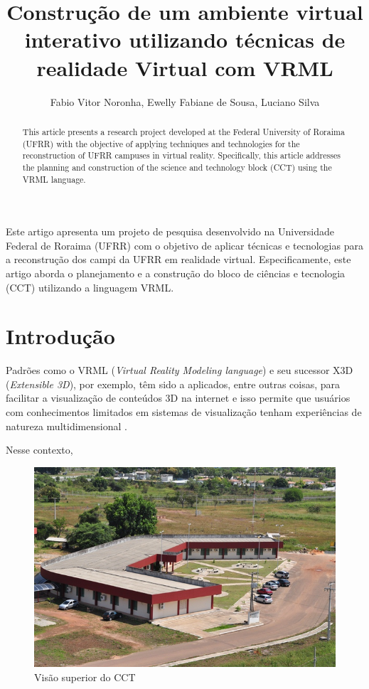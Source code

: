 \documentclass[12pt]{article}
\title{Construção de um ambiente virtual interativo utilizando técnicas de realidade Virtual com VRML}
\author{Fabio Vitor Noronha\inst{1}, Ewelly Fabiane de Sousa\inst{1}, Luciano Silva\inst{1}}
\begin{document}
 

\maketitle

\begin{abstract}
  This article presents a research project developed at the Federal University of Roraima (UFRR) with the objective of applying techniques and technologies for the reconstruction of UFRR campuses in virtual reality. Specifically, this article addresses the planning and construction of the science and technology block (CCT) using the VRML language.
\end{abstract}
     
\begin{resumo} 
  Este artigo apresenta um projeto de pesquisa desenvolvido na Universidade Federal de Roraima (UFRR) com o objetivo de aplicar técnicas e tecnologias para a reconstrução dos campi da UFRR em realidade virtual. Especificamente, este artigo aborda o planejamento e a construção do bloco de ciências e tecnologia (CCT) utilizando a linguagem VRML.
\end{resumo}


\section{Introdução}

Padrões como o VRML (\textit{Virtual Reality Modeling language}) e seu sucessor X3D (\textit{Extensible 3D}), por exemplo, têm sido a aplicados, entre outras coisas, para facilitar a visualização de conteúdos 3D na internet \cite{web3d2005open} e isso permite que usuários com conhecimentos limitados em sistemas de visualização tenham experiências de natureza multidimensional \cite{buriol2007modelagem}.

Nesse contexto, 




\begin{figure}[ht]
\centering
\includegraphics[width=.7\textwidth]{upper.jpg}
\caption{Visão superior do CCT}
\label{fig:upperviewblockv}
\end{figure}




\end{document}
